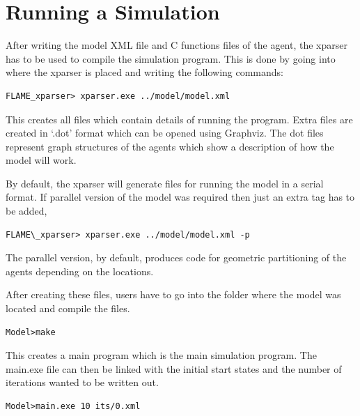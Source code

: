 \documentclass[a4paper,11pt]{article}
\newenvironment{mylisting}
{\begin{list}{}{\setlength{\leftmargin}{1em}}\item\small\bfseries}
{\end{list}}
\begin{document}
\section{Running a Simulation}

After writing the model XML file and C functions files of the agent,
the xparser has to be used to compile the simulation program. This
is done by going into where the xparser is placed and writing the
following commands:

\begin{mylisting}
\begin{verbatim}
FLAME_xparser> xparser.exe ../model/model.xml
\end{verbatim}
\end{mylisting}

This creates all files which contain details of running the program.
Extra files are created in `.dot' format which can be opened using
Graphviz. The dot files represent graph structures of the agents
which show a description of how the model will work.

By default, the xparser will generate files for running the model in
a serial format. If parallel version of the model was required then
just an extra tag has to be added,

\begin{mylisting}
\begin{verbatim}
FLAME\_xparser> xparser.exe ../model/model.xml -p
\end{verbatim}
\end{mylisting}

The parallel version, by default, produces code for geometric
partitioning of the agents depending on the locations.

After creating these files, users have to go into the folder where
the model was located and compile the files.

\begin{mylisting}
\begin{verbatim}
Model>make
\end{verbatim}
\end{mylisting}

This creates a main program which is the main simulation program.
The main.exe file can then be linked with the initial start states
and the number of iterations wanted to be written out.
\begin{mylisting}
\begin{verbatim}
Model>main.exe 10 its/0.xml
\end{verbatim}
\end{mylisting}
\end{document}
